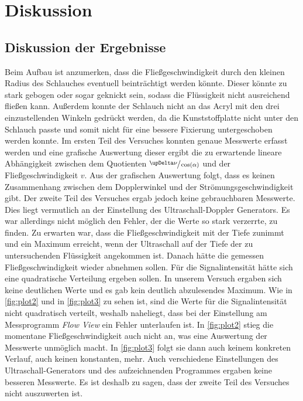 \section{Diskussion}
\label{sec:Diskussion}

\subsection{Diskussion der Ergebnisse}
\label{subsec:diskErg}
Beim Aufbau ist anzumerken, dass die Fließgeschwindigkeit durch den kleinen Radius des Schlauches eventuell beinträchtigt werden könnte.
Dieser könnte zu stark gebogen oder sogar geknickt sein, sodass die Flüssigkeit nicht ausreichend fließen kann.
Außerdem konnte der Schlauch nicht an das Acryl mit den drei einzustellenden Winkeln gedrückt werden, da die Kunststoffplatte nicht 
unter den Schlauch passte und somit nicht für eine bessere Fixierung untergeschoben werden konnte.\newline
Im ersten Teil des Versuches konnten genaue Messwerte erfasst werden und eine grafische Auswertung dieser ergibt die zu erwartende lineare Abhängigkeit
zwischen dem Quotienten $\sfrac{\upDelta\nu}{\cos(\alpha)}$ und der Fließgeschwindigkeit $v$.
Aus der grafischen Auswertung folgt, dass es keinen Zusammenhang zwischen dem Dopplerwinkel und der Strömungsgeschwindigkeit gibt.\newline
Der zweite Teil des Versuches ergab jedoch keine gebrauchbaren Messwerte. Dies liegt vermutlich an der Einstellung des Ultraschall-Doppler Generators.
Es war allerdings nicht möglich den Fehler, der die Werte so stark verzerrte, zu finden. Zu erwarten war, dass die Fließgeschwindigkeit mit der Tiefe zunimmt
und ein Maximum erreicht, wenn der Ultraschall auf der Tiefe der zu untersuchenden Flüssigkeit angekommen ist. Danach hätte die gemessen 
Fließgeschwindigkeit wieder abnehmen sollen. Für die Signalintensität hätte sich eine quadratische Verteilung ergeben sollen.\newline
In unserem Versuch ergaben sich keine deutlichen Werte und es gab kein deutlich abzulesendes Maximum. Wie in \autoref{fig:plot2} und in \autoref{fig:plot3} zu sehen ist, sind
die Werte für die Signalintensität nicht quadratisch verteilt, weshalb naheliegt, dass bei der Einstellung am Messprogramm \textit{Flow View} ein Fehler unterlaufen ist.
In \autoref{fig:plot2} stieg die momentane Fließgeschwindigkeit auch nicht an, was eine Auswertung der Messwerte unmöglich macht. In \autoref{fig:plot3} folgt sie dann auch keinem 
konkreten Verlauf, auch keinen konstanten, mehr. Auch verschiedene Einstellungen des Ultraschall-Generators und des aufzeichnenden Programmes ergaben keine besseren Messwerte.
Es ist deshalb zu sagen, dass der zweite Teil des Versuches nicht auszuwerten ist.\newline

